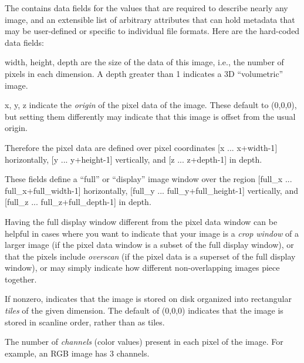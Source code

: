 The \ImageSpec contains data fields for the values that are
required to describe nearly any image, and an extensible list of
arbitrary attributes that can hold metadata that may be user-defined or
specific to individual file formats.  Here are the hard-coded data
fields:


{\cf width, height, depth} are the size of the data of this image, i.e.,
the number of pixels in each dimension.  A {\cf depth} greater than 1
indicates a 3D ``volumetric'' image.

{\cf x, y, z} indicate the \emph{origin} of the pixel data of the image.
These default to (0,0,0), but setting them differently may indicate that
this image is offset from the usual origin.

Therefore the pixel data are defined over pixel coordinates
[{\cf x} ... {\cf x+width-1}] horizontally, 
[{\cf y} ... {\cf y+height-1}] vertically, 
and [{\cf z} ... {\cf z+depth-1}] in depth.
\apiend


These fields define a ``full'' or ``display'' image window over the
region [{\cf full_x} ... {\cf full_x+full_width-1}] horizontally, 
[{\cf full_y} ... {\cf full_y+full_height-1}] vertically, 
and [{\cf full_z} ... {\cf full_z+full_depth-1}] in depth.

Having the full display window different from the pixel data window can
be helpful in cases where you want to indicate that your image is a
\emph{crop window} of a larger image (if the pixel data window is a
subset of the full display window), or that the pixels include
\emph{overscan} (if the pixel data is a superset of the full display
window), or may simply indicate how different non-overlapping images
piece together.
\apiend

If nonzero, indicates that the image is stored on disk organized into
rectangular \emph{tiles} of the given dimension.  The default of 
(0,0,0) indicates that the image is stored in scanline order, rather
than as tiles.
\apiend

The number of \emph{channels} (color values) present in each pixel of
the image.  For example, an RGB image has 3 channels.
\apiend


